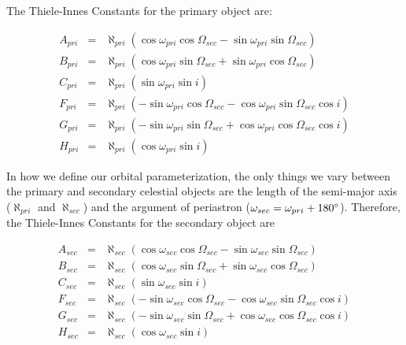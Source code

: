 \documentclass[twocolumn]{aastex701}
\newcommand{\w}{\omega_{pri}}
\newcommand{\wsec}{\omega_{sec}}
\newcommand{\bigomega}{\Omega_{sec}}
\newcommand{\inclination}{\textit{i}}
\newcommand{\al}{\aleph_{pri}}
\newcommand{\ala}{\aleph_{sec}}
\newcommand{\Apri}{A_{pri}}
\newcommand{\Asec}{A_{sec}}
\newcommand{\Bpri}{B_{pri}}
\newcommand{\Bsec}{B_{sec}}
\newcommand{\Cpri}{C_{pri}}
\newcommand{\Csec}{C_{sec}}
\newcommand{\Fpri}{F_{pri}}
\newcommand{\Fsec}{F_{sec}}
\newcommand{\Gpri}{G_{pri}}
\newcommand{\Gsec}{G_{sec}}
\newcommand{\Hpri}{H_{pri}}
\newcommand{\Hsec}{H_{sec}}
\begin{document}
The Thiele-Innes Constants for the primary object are:

\begin{eqnarray}
    \Apri &=& \al \left(\cos \w \cos \bigomega - \sin \w \sin \bigomega \right) \nonumber \\
    \Bpri &=& \al \left(\cos \w \sin \bigomega + \sin \w \cos \bigomega \right) \nonumber  \\
    \Cpri &=& \al \left(\sin \w \sin \inclination\right) \nonumber \\
    \Fpri &=& \al \left(-\sin \w \cos \bigomega - \cos \w \sin \bigomega \cos \inclination \right) \nonumber \\
    \Gpri &=& \al \left(-\sin \w \sin \bigomega + \cos \w \cos \bigomega \cos \inclination \right) \nonumber \\
    \Hpri &=& \al \left(\cos \w \sin \inclination \right) 
\end{eqnarray}

In how we define our orbital parameterization, the only things we vary between the primary and secondary celestial objects are the length of the semi-major axis ($\al$ and $\ala$) and the argument of periastron ($\wsec = \w + 180 \degree$). Therefore, the Thiele-Innes Constants for the secondary object are

\begin{eqnarray}
    \Asec &=& \ala \left(\cos \wsec \cos \bigomega - \sin\wsec  \sin \bigomega \right) \nonumber \\
    \Bsec &=& \ala \left(\cos\wsec  \sin \bigomega + \sin\wsec  \cos \bigomega \right) \nonumber \\
    \Csec &=& \ala \left(\sin\wsec  \sin \inclination\right) \nonumber \\
    \Fsec &=& \ala \left(-\sin\wsec  \cos \bigomega - \cos\wsec  \sin \bigomega \cos \inclination \right) \nonumber  \\
    \Gsec &=& \ala \left(-\sin \wsec  \sin \bigomega + \cos\wsec  \cos \bigomega \cos \inclination \right) \nonumber  \\
    \Hsec &=& \ala \left(\cos \wsec \sin \inclination \right) 
\end{eqnarray}
\end{document}
